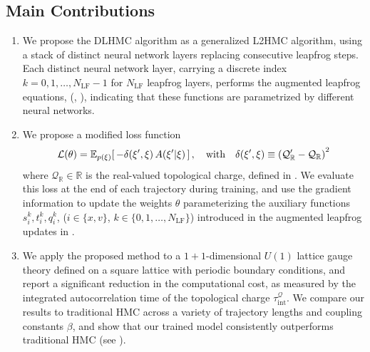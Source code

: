 \documentclass{article} %
\begin{document}
\subsection{\label{subsec:main_contributions}Main Contributions}
\begin{enumerate}
   \item We propose the DLHMC algorithm as a generalized L2HMC algorithm,
      using a stack of distinct neural network layers replacing consecutive leapfrog steps.
      Each distinct neural network layer, carrying a discrete index \(k = 0, 1, \ldots, N_{\mathrm{LF}}-1\) for $N_{\mathrm{LF}}$
      leapfrog layers, performs the
      augmented leapfrog equations, (, ), indicating that
      these functions are parametrized by different neural networks.
   \item We propose a modified loss function
      \begin{equation}
          \mathcal{L}(\theta) = \mathbb{E}_{p(\xi)}{%
              \left[ \, -\delta(\xi^{\prime}, \xi) \, A(\xi^{\prime}|\xi)\,\right],\quad\text{with}\quad%
          \delta(\xi^{\prime}, \xi) \equiv
      {\left(\mathcal{Q}_{\mathbb{R}}^{\prime}-\mathcal{Q}_{\mathbb{R}}\right)}^{2}
          }
      \end{equation}
      where \(\mathcal{Q}_{\mathbb{R}}\in\mathbb{R}\) is the real-valued topological charge, defined in .
      We evaluate this loss at the end of each trajectory during training, and use the gradient information to update
      the weights \(\theta\) parameterizing the auxiliary functions \(s^{k}_{i}, t^{k}_{i}, q^{k}_{i}\), (\(i \in\{x, v\}\), \(k \in \{0, 1, \ldots, N_{\mathrm{LF}}\}\))
      introduced in the augmented leapfrog updates in .
   \item We apply the proposed method to a \(1+1\)-dimensional \(U(1)\) lattice gauge theory defined on a
      square lattice with periodic boundary conditions, and report a significant reduction in the
      computational cost, as measured by the integrated autocorrelation time of the topological charge
      \(\tau_{\mathrm{int}}^{\mathcal{Q}}\).
      We compare our results to traditional HMC across a variety of trajectory lengths and coupling constants
      \(\beta\), and show that our trained model consistently outperforms traditional HMC (see
      ).
\end{enumerate}
%
\end{document}
